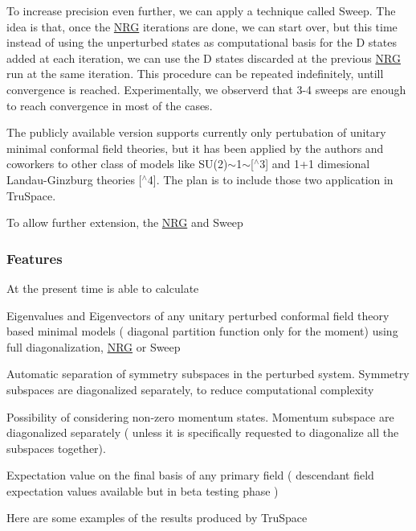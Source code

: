 To increase precision even further, we can apply a technique called {\ttfamily Sweep}. The idea is that, once the {\ttfamily \mbox{\hyperlink{classNRG}{N\+RG}}} iterations are done, we can start over, but this time instead of using the unperturbed states as computational basis for the D states added at each iteration, we can use the D states discarded at the previous {\ttfamily \mbox{\hyperlink{classNRG}{N\+RG}}} run at the same iteration. This procedure can be repeated indefinitely, untill convergence is reached. Experimentally, we observerd that 3-\/4 sweeps are enough to reach convergence in most of the cases.

The publicly available version supports currently only pertubation of unitary minimal conformal field theories, but it has been applied by the authors and coworkers to other class of models like S\+U(2)$\sim$1$\sim$\mbox{[}$^\wedge$3\mbox{]} and 1+1 dimesional Landau-\/\+Ginzburg theories \mbox{[}$^\wedge$4\mbox{]}. The plan is to include those two application in Tru\+Space.

To allow further extension, the {\ttfamily \mbox{\hyperlink{classNRG}{N\+RG}}} and {\ttfamily Sweep}

\subsubsection*{Features}

At the present time is able to calculate


\begin{DoxyItemize}
\item Eigenvalues and Eigenvectors of any unitary perturbed conformal field theory based minimal models ( diagonal partition function only for the moment) using full diagonalization, {\ttfamily \mbox{\hyperlink{classNRG}{N\+RG}}} or {\ttfamily Sweep}
\item Automatic separation of symmetry subspaces in the perturbed system. Symmetry subspaces are diagonalized separately, to reduce computational complexity
\item Possibility of considering non-\/zero momentum states. Momentum subspace are diagonalized separately ( unless it is specifically requested to diagonalize all the subspaces together).
\item Expectation value on the final basis of any primary field ( descendant field expectation values available but in beta testing phase )
\end{DoxyItemize}

Here are some examples of the results produced by Tru\+Space

